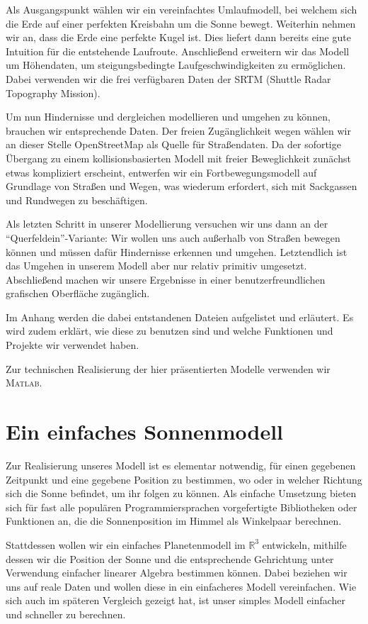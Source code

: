 \documentclass[
    paper=a4,
    DIV14,
    fontsize=12pt,
    pagesize=pdftex,
    toc=bibliographynumbered
]{scrartcl}
\numberwithin{figure}{section}
\numberwithin{equation}{section}
\numberwithin{table}{section}
\newcommand*\setR{\mathds{R}}
\begin{document}
Als Ausgangspunkt wählen wir ein vereinfachtes Umlaufmodell, bei welchem sich die Erde
auf einer perfekten Kreisbahn um die Sonne bewegt. Weiterhin nehmen wir an, dass die Erde
eine perfekte Kugel ist. Dies liefert dann bereits eine gute Intuition für die
entstehende Laufroute. Anschließend erweitern wir das Modell um Höhendaten, um
steigungsbedingte Laufgeschwindigkeiten zu ermöglichen. Dabei verwenden wir die frei
verfügbaren Daten der SRTM (Shuttle Radar Topography Mission).

Um nun Hindernisse und dergleichen modellieren und umgehen zu können, brauchen wir
entsprechende Daten. Der freien Zugänglichkeit wegen wählen wir an dieser Stelle
OpenStreetMap als Quelle für Straßendaten. Da der sofortige Übergang zu einem
kollisionsbasierten Modell mit freier Beweglichkeit zunächst etwas kompliziert erscheint,
entwerfen wir ein Fortbewegungsmodell auf Grundlage von Straßen und Wegen, was wiederum
erfordert, sich mit Sackgassen und Rundwegen zu beschäftigen.

Als letzten Schritt in unserer Modellierung versuchen wir uns dann an der
\enquote{Querfeldein}-Variante: Wir wollen uns auch außerhalb von Straßen bewegen
können und müssen dafür Hindernisse erkennen und umgehen. Letztendlich ist das Umgehen in
unserem Modell aber nur relativ primitiv umgesetzt. Abschließend machen wir unsere
Ergebnisse in einer benutzerfreundlichen grafischen Oberfläche zugänglich.

Im Anhang werden die dabei entstandenen Dateien aufgelistet und erläutert. Es wird zudem
erklärt, wie diese zu benutzen sind und welche Funktionen und Projekte wir verwendet haben.

Zur technischen Realisierung der hier präsentierten Modelle verwenden wir \textsc{Matlab}.

\section{Ein einfaches Sonnenmodell}
\label{sec:sonne}
Zur Realisierung unseres Modell ist es elementar notwendig, für einen gegebenen Zeitpunkt
und eine gegebene Position zu bestimmen, wo oder in welcher Richtung sich die Sonne
befindet, um ihr folgen zu können. Als einfache Umsetzung bieten sich für fast alle
populären Programmiersprachen vorgefertigte Bibliotheken oder Funktionen an, die die
Sonnenposition im Himmel als Winkelpaar berechnen.

Stattdessen wollen wir ein einfaches Planetenmodell im $\setR^3$ entwickeln, mithilfe
dessen wir die Position der Sonne und die entsprechende Gehrichtung unter Verwendung
einfacher linearer Algebra bestimmen können. Dabei beziehen wir uns auf reale Daten und
wollen diese in ein einfacheres Modell vereinfachen. Wie sich auch im späteren Vergleich
gezeigt hat, ist unser simples Modell einfacher und schneller zu berechnen.
\end{document}
